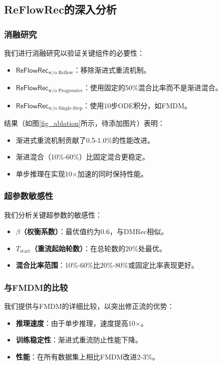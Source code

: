 \documentclass[sigconf]{acmart}
\begin{document}
\subsection{ReFlowRec的深入分析}
\subsubsection{\textbf{消融研究}}
我们进行消融研究以验证关键组件的必要性：
\begin{itemize}[leftmargin=*]
\item $\textsf{ReFlowRec}_{\text{w/o Reflow}}$：移除渐进式重流机制。
\item $\textsf{ReFlowRec}_{\text{w/o Progressive}}$：使用固定的50\%混合比率而不是渐进混合。
\item $\textsf{ReFlowRec}_{\text{w/o Single-Step}}$：使用10步ODE积分，如FMDM。
\end{itemize}

结果（如图\ref{fig_ablation}所示，待添加图片）表明：
\begin{itemize}[leftmargin=*]
\item 渐进式重流机制贡献了0.5-1.0\%的性能改进。
\item 渐进混合（10\%-60\%）比固定混合更稳定。
\item 单步推理在实现10$\times$加速的同时保持性能。
\end{itemize}

\subsubsection{\textbf{超参数敏感性}}
我们分析关键超参数的敏感性：
\begin{itemize}[leftmargin=*]
\item \textbf{$\beta$（权衡系数）}：最优值约为0.6，与DMRec相似。
\item \textbf{$T_{\text{start}}$（重流起始轮数）}：在总轮数的20\%处最优。
\item \textbf{混合比率范围}：10\%-60\%比20\%-80\%或固定比率表现更好。
\end{itemize}

\subsubsection{\textbf{与FMDM的比较}}
我们提供与FMDM的详细比较，以突出修正流的优势：
\begin{itemize}[leftmargin=*]
\item \textbf{推理速度}：由于单步推理，速度提高10$\times$。
\item \textbf{训练稳定性}：渐进式重流防止性能下降。
\item \textbf{性能}：在所有数据集上相比FMDM改进2-3\%。
\end{itemize}
\end{document}
